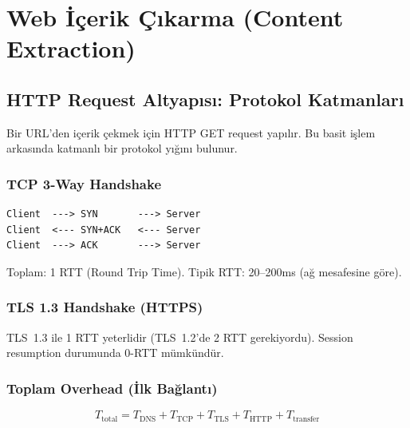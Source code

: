 \section{Web \.{I}\c{c}erik \c{C}{\i}karma (Content Extraction)}
\label{sec:content-extraction}

\subsection{HTTP Request Altyap{\i}s{\i}: Protokol Katmanlar{\i}}

Bir URL'den i\c{c}erik \c{c}ekmek i\c{c}in HTTP GET request yap{\i}l{\i}r. Bu basit i\c{s}lem arkas{\i}nda katmanl{\i} bir protokol y{\i}\u{g}{\i}n{\i} bulunur.

\subsubsection{TCP 3-Way Handshake}

\begin{lstlisting}[language={}, caption={TCP ba\u{g}lant{\i} kurulumu}, label={lst:tcp-handshake}]
Client  ---> SYN       ---> Server
Client  <--- SYN+ACK   <--- Server
Client  ---> ACK       ---> Server
\end{lstlisting}

\noindent
Toplam: 1 RTT (Round Trip Time). Tipik RTT: 20--200ms (a\u{g} mesafesine g\"{o}re).

\subsubsection{TLS 1.3 Handshake (HTTPS)}

TLS~1.3 ile 1 RTT yeterlidir (TLS~1.2'de 2 RTT gerekiyordu). Session resumption durumunda 0-RTT m\"{u}mk\"{u}nd\"{u}r.

\subsubsection{Toplam Overhead (\.{I}lk Ba\u{g}lant{\i})}

\begin{equation}
T_{\text{total}} = T_{\text{DNS}} + T_{\text{TCP}} + T_{\text{TLS}} + T_{\text{HTTP}} + T_{\text{transfer}}
\label{eq:search-http-overhead}
\end{equation}

